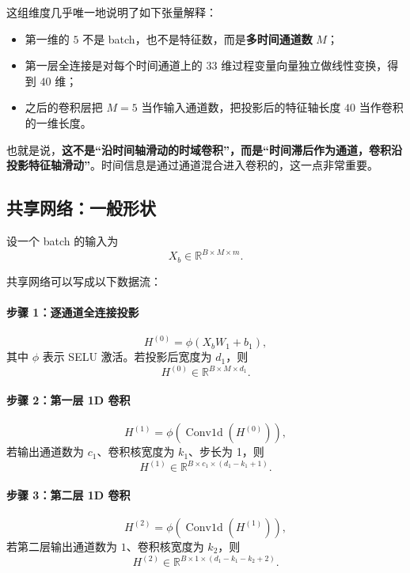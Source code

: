 \documentclass[UTF8]{ctexart}
\begin{document}
这组维度几乎唯一地说明了如下张量解释：
\begin{itemize}
    \item 第一维的 $5$ 不是 batch，也不是特征数，而是\textbf{多时间通道数} $M$；
    \item 第一层全连接是对每个时间通道上的 $33$ 维过程变量向量独立做线性变换，得到 $40$ 维；
    \item 之后的卷积层把 $M=5$ 当作输入通道数，把投影后的特征轴长度 $40$ 当作卷积的一维长度。
\end{itemize}

也就是说，\textbf{这不是“沿时间轴滑动的时域卷积”，而是“时间滞后作为通道，卷积沿投影特征轴滑动”}。时间信息是通过通道混合进入卷积的，这一点非常重要。

\subsection{共享网络：一般形状}

设一个 batch 的输入为
\begin{equation}
    X_b \in \mathbb{R}^{B \times M \times m}.
\end{equation}

共享网络可以写成以下数据流：

\paragraph{步骤 1：逐通道全连接投影}
\begin{equation}
    H^{(0)} = \phi(X_b W_1 + b_1),
\end{equation}
其中 $\phi$ 表示 SELU 激活。若投影后宽度为 $d_1$，则
\begin{equation}
    H^{(0)} \in \mathbb{R}^{B \times M \times d_1}.
\end{equation}

\paragraph{步骤 2：第一层 1D 卷积}
\begin{equation}
    H^{(1)} = \phi(\operatorname{Conv1d}(H^{(0)})),
\end{equation}
若输出通道数为 $c_1$、卷积核宽度为 $k_1$、步长为 1，则
\begin{equation}
    H^{(1)} \in \mathbb{R}^{B \times c_1 \times (d_1-k_1+1)}.
\end{equation}

\paragraph{步骤 3：第二层 1D 卷积}
\begin{equation}
    H^{(2)} = \phi(\operatorname{Conv1d}(H^{(1)})),
\end{equation}
若第二层输出通道数为 $1$、卷积核宽度为 $k_2$，则
\begin{equation}
    H^{(2)} \in \mathbb{R}^{B \times 1 \times (d_1-k_1-k_2+2)}.
\end{equation}
\end{document}
